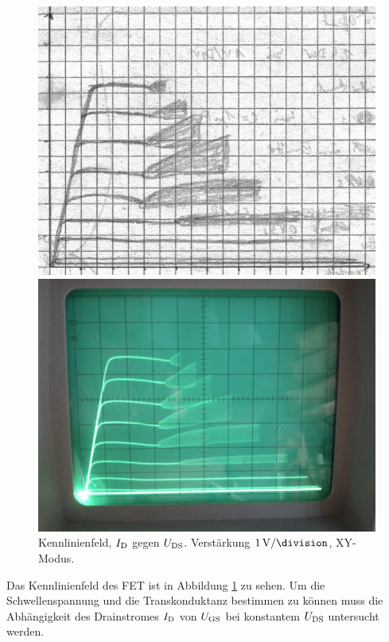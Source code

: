 \begin{figure}
	\label{fig:4}
	\begin{minipage}{0.45\linewidth}
		\includegraphics[width=\linewidth]{Oszi_Hand/3-04.jpg}
	\end{minipage}
	\begin{minipage}{.45\linewidth}
		\includegraphics[width=\linewidth]{Oszi_Foto/3-04.jpg}
	\end{minipage}
	\caption{%
		Kennlinienfeld, $I_\text{D}$ gegen $U_\text{DS}$. Verstärkung $\SI
		1{\volt\per\division}$, XY-Modus.
	}
\end{figure}

Das Kennlinienfeld des FET ist in Abbildung \ref{fig:4} zu sehen. Um die
Schwellenspannung und die Transkonduktanz bestimmen zu können muss die
Abhängigkeit des Drainstromes $I_\text{D}$ von $U_\text{GS}$ bei konstantem $U_\text{DS}$ untersucht
werden.

